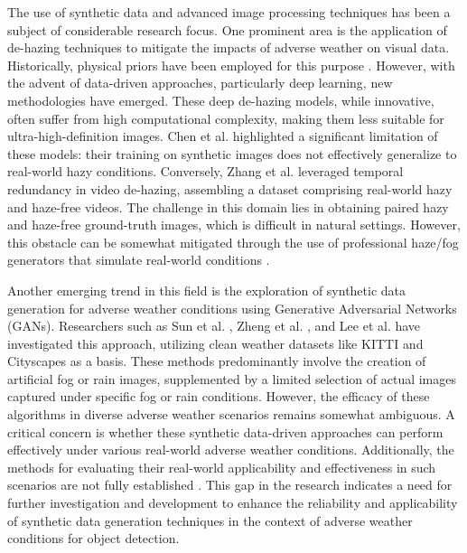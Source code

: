 \documentclass[report.tex]{subfiles}
\begin{document}
    The use of synthetic data and advanced image processing techniques has been a subject of considerable research focus. One prominent area is the application of de-hazing techniques to mitigate the impacts of adverse weather on visual data. Historically, physical priors have been employed for this purpose \cite{tan2008visibility, tarel2009fast}. However, with the advent of data-driven approaches, particularly deep learning, new methodologies have emerged. These deep de-hazing models, while innovative, often suffer from high computational complexity, making them less suitable for ultra-high-definition images. Chen et al. \cite{chen2021psd} highlighted a significant limitation of these models: their training on synthetic images does not effectively generalize to real-world hazy conditions. Conversely, Zhang et al. \cite{zhang2021learning} leveraged temporal redundancy in video de-hazing, assembling a dataset comprising real-world hazy and haze-free videos. The challenge in this domain lies in obtaining paired hazy and haze-free ground-truth images, which is difficult in natural settings. However, this obstacle can be somewhat mitigated through the use of professional haze/fog generators that simulate real-world conditions \cite{musat2021multi, timofte2018ntire}.

    Another emerging trend in this field is the exploration of synthetic data generation for adverse weather conditions using Generative Adversarial Networks (GANs). Researchers such as Sun et al. \cite{sun2021multi}, Zheng et al. \cite{zheng2020forkgan}, and Lee et al. \cite{lee2022perception} have investigated this approach, utilizing clean weather datasets like KITTI \cite{geiger2012we} and Cityscapes \cite{cordts2016cityscapes} as a basis. These methods predominantly involve the creation of artificial fog or rain images, supplemented by a limited selection of actual images captured under specific fog or rain conditions. However, the efficacy of these algorithms in diverse adverse weather scenarios remains somewhat ambiguous. A critical concern is whether these synthetic data-driven approaches can perform effectively under various real-world adverse weather conditions. Additionally, the methods for evaluating their real-world applicability and effectiveness in such scenarios are not fully established \cite{hassaballah2020vehicle}. This gap in the research indicates a need for further investigation and development to enhance the reliability and applicability of synthetic data generation techniques in the context of adverse weather conditions for object detection.
\end{document}
